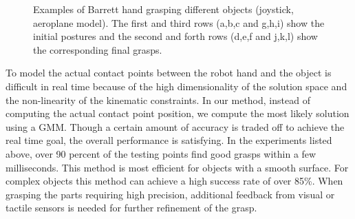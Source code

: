 \begin{figure}

  \caption{  {Examples of Barrett hand grasping different objects (joystick, aeroplane model). The first and third rows (a,b,c and g,h,i) show the initial postures and the second and forth rows (d,e,f and j,k,l) show the corresponding final grasps.}
}
    \label{barrett2}
\end{figure}




To model the actual contact points between the robot hand and the object is difficult in real time because of the high dimensionality of the solution space and the non-linearity of the kinematic constraints. In our method, instead of computing the actual contact point position, we compute the most likely solution using a GMM. Though a certain amount of accuracy is traded off to achieve the real time goal, the overall performance is satisfying. In the experiments listed above, over 90 percent of the testing points find good grasps within a few milliseconds. This method is most efficient for objects with a smooth surface. For complex objects this method can achieve a high success rate of over 85\%. When grasping the parts requiring high precision, additional feedback from visual or tactile sensors is needed for further refinement of the grasp.

